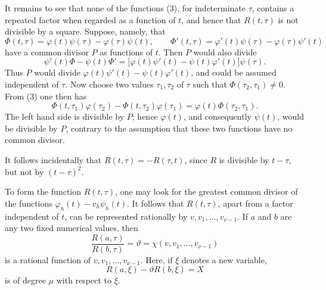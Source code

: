 \documentclass[11pt]{article}
\begin{document}
It remains to see that none of the functions (3), for indeterminate \(\tau\), contains a repeated factor when regarded as a function of \(t\), and hence that \(R(t,\tau)\) is not divisible by a square. Suppose, namely, that
\[
\Phi(t,\tau)=\varphi(t)\psi(\tau)-\varphi(\tau)\psi(t),
\qquad
\Phi'(t,\tau)=\varphi'(t)\psi(\tau)-\varphi(\tau)\psi'(t)
\]
have a common divisor \(P\) as functions of \(t\). Then \(P\) would also divide
\[
\psi'(t)\Phi-\psi(t)\Phi'
=
\bigl[\varphi(t)\psi'(t)-\psi(t)\varphi'(t)\bigr]\psi(\tau).
\]
Thus \(P\) would divide \(\varphi(t)\psi'(t)-\psi(t)\varphi'(t)\), and could be assumed independent of \(\tau\). Now choose two values \(\tau_1,\tau_2\) of \(\tau\) such that \(\Phi(\tau_2,\tau_1)\neq0\). From (3) one then has
\[
\Phi(t,\tau_1)\varphi(\tau_2)-\Phi(t,\tau_2)\varphi(\tau_1)
=
\varphi(t)\Phi(\tau_2,\tau_1).
\]
The left hand side is divisible by \(P\); hence \(\varphi(t)\), and consequently \(\psi(t)\), would be divisible by \(P\), contrary to the assumption that these two functions have no common divisor.

It follows incidentally that \(R(t,\tau)=-R(\tau,t)\), since \(R\) is divisible by \(t-\tau\), but not by \((t-\tau)^2\).

To form the function \(R(t,\tau)\), one may look for the greatest common divisor of the functions \(\varphi_h(t)-v_h\psi_h(t)\). It follows that \(R(t,\tau)\), apart from a factor independent of \(t\), can be represented rationally by \(v,v_1,\ldots,v_{\nu-1}\). If \(a\) and \(b\) are any two fixed numerical values, then
\begin{equation}
\frac{R(a,\tau)}{R(b,\tau)}
=\vartheta
=
\chi(v,v_1,\ldots,v_{\nu-1})
\tag{5}
\end{equation}
is a rational function of \(v,v_1,\ldots,v_{\nu-1}\). Here, if \(\xi\) denotes a new variable,
\begin{equation}
R(a,\xi)-\vartheta R(b,\xi)=X
\tag{6}
\end{equation}
is of degree \(\mu\) with respect to \(\xi\).
\end{document}
